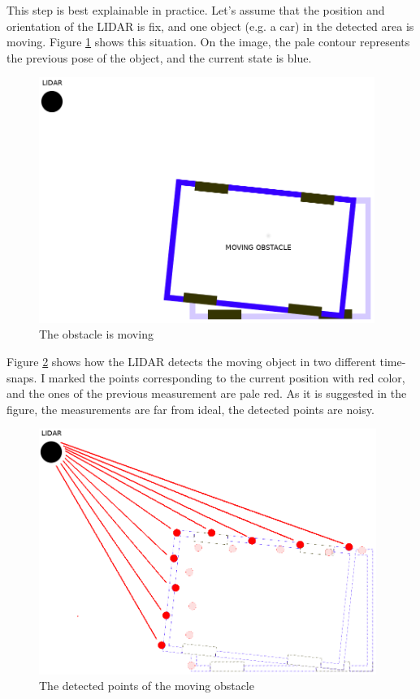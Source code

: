 This step is best explainable in practice. Let's assume that the position and orientation of the LIDAR is fix, and one object (e.g. a car) in the detected area is moving. Figure \ref{obstacle_movement} shows this situation. On the image, the pale contour represents the previous pose of the object, and the current state is blue.

\begin{figure}[!ht]
    \centering
    \includegraphics[height=80mm]{figures/raw/obstacle_movement.png}
    \caption{The obstacle is moving}
    \label{obstacle_movement}
\end{figure}

Figure \ref{obstacle_movement_lidar} shows how the LIDAR detects the moving object in two different time-snaps. I marked the points corresponding to the current position with red color, and the ones of the previous measurement are pale red. As it is suggested in the figure, the measurements are far from ideal, the detected points are noisy.

\begin{figure}[!ht]
    \centering
    \includegraphics[height=80mm]{figures/raw/obstacle_movement_lidar.png}
    \caption{The detected points of the moving obstacle}
    \label{obstacle_movement_lidar}
\end{figure}

